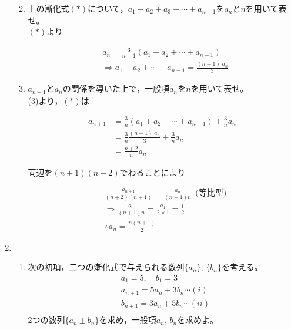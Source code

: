 \documentclass[autodetect-engine,ja=standard, 10.5pt, a4paper, titlepage]{bxjsarticle}
\begin{document}
\begin{enumerate}[1.]
\begin{enumerate}[(1)]
\baselineskip
    \item 上の漸化式$(*)$について，$a_1 + a_2 + a_3 + \cdots + a_{n-1}$を$a_n$と$n$を用いて表せ。\\
          $(*)$より
            \begin{fleqn}[20pt]
              \begin{align*}
                &a_n = \frac{3}{n-1}(a_1 + a_2 + \cdots + a_{n-1}) \\
                &\Rightarrow a_1 + a_2 + \cdots + a_{n-1} = \frac{(n-1)\;a_n}{3}
              \end{align*}
            \end{fleqn}

\baselineskip
    \item $a_{n+1}$と$a_n$の関係を導いた上で，一般項$a_n$を$n$を用いて表せ。\\
          (3)より，$(*)$は
            \begin{fleqn}[20pt]
              \begin{align*}
                a_{n+1}
                &= \frac{3}{n}(a_1 + a_2 + \cdots + a_{n-1}) + \frac{3}{n}a_n \\
                &= \frac{3}{n}\frac{(n-1)\;a_n}{3} + \frac{3}{n}a_n \\
                &= \frac{n+2}{n}a_n
              \end{align*}
            \end{fleqn}
          両辺を$(n+1)(n+2)$でわることにより
            \begin{fleqn}[20pt]
              \begin{align*}
                &\frac{a_{n+1}}{(n+2)(n+1)} = \frac{a_n}{(n+1)n} \:\: \text{(等比型)} \\
                & \Rightarrow \frac{a_n}{(n+1)n} = \frac{a_1}{2\times 1} = \frac{1}{2} \\
                & \therefore a_n = \frac{n(n+1)}{2}
              \end{align*}
            \end{fleqn}
  \end{enumerate}

\clearpage

  \item
  \begin{enumerate}[(1)]
    \item 次の初項，二つの漸化式で与えられる数列$\{a_n\},\, \{b_n\}$を考える。\\
      \begin{align*}
        &a_1 = 5,\quad b_1 = 3\\
        &a_{n+1} = 5a_n + 3b_n \cdots (i) \\
        &b_{n+1} = 3a_n + 5b_n \cdots (ii) \\
      \end{align*}
    2つの数列$\{a_n\pm b_n\}$を求め，一般項$a_n,\, b_n$を求めよ。\\


\end{enumerate}
\end{enumerate}
\end{document}
